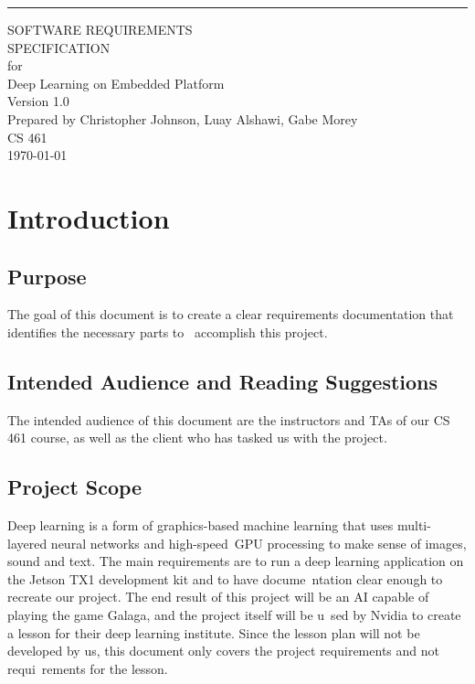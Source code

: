 \documentclass{scrreprt}
\date{}
\def\myversion{1.0 }
\begin{document}
\begin{flushright}
    \rule{16cm}{5pt}\vskip1cm
    \begin{bfseries}
        \Huge{SOFTWARE REQUIREMENTS\\ SPECIFICATION}\\
        \vspace{1.9cm}
        for\\
        \vspace{1.9cm}
        Deep Learning on Embedded Platform\\
        \vspace{1.9cm}
        \LARGE{Version \myversion}\\
        \vspace{1.9cm}
        Prepared by Christopher Johnson, Luay Alshawi, Gabe Morey\\
        \vspace{1.9cm}
        CS 461\\
        \vspace{1.9cm}
        \today\\
    \end{bfseries}
\end{flushright}

\tableofcontents

\chapter{Introduction}

\section{Purpose}
The goal of this document is to create a clear requirements documentation that identifies the necessary parts to \
accomplish this project.

\section{Intended Audience and Reading Suggestions}
The intended audience of this document are the instructors and TAs of our CS 461 course, as well as the client who has tasked us with the project.

\section{Project Scope}
Deep learning is a form of graphics-based machine learning that uses multi-layered neural networks and high-speed\
 GPU processing to make sense of images, sound and text.
The main requirements are to run a deep learning application on the Jetson TX1 development kit and to have docume\
ntation clear enough to recreate our project.
The end result of this project will be an AI capable of playing the game Galaga, and the project itself will be u\
sed by Nvidia to create a lesson for their deep learning institute.
Since the lesson plan will not be developed by us, this document only covers the project requirements and not requi\
rements for the lesson.
\end{document}

